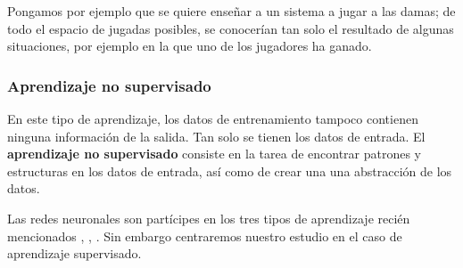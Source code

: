 Pongamos por ejemplo que se quiere enseñar a un sistema a jugar
a las damas; de todo el espacio de jugadas posibles, se conocerían tan solo el resultado de algunas situaciones, por ejemplo en la que uno de los jugadores ha ganado.  

\subsubsection{Aprendizaje no supervisado}  

En este tipo de aprendizaje, los datos de entrenamiento tampoco contienen ninguna información de la salida.
 Tan solo se tienen los datos de entrada. El \textbf{aprendizaje no supervisado} 
 consiste en la tarea de encontrar patrones y estructuras en los datos de entrada, 
 así como de crear una una abstracción de los datos.  


Las redes neuronales son partícipes en los tres tipos de aprendizaje 
recién mencionados
\cite{8612259}, \cite{DBLP:journals/corr/BakerGNR16}, \cite{10.5555/2955491.2955578}. Sin embargo centraremos nuestro estudio en el caso 
de aprendizaje supervisado. 

